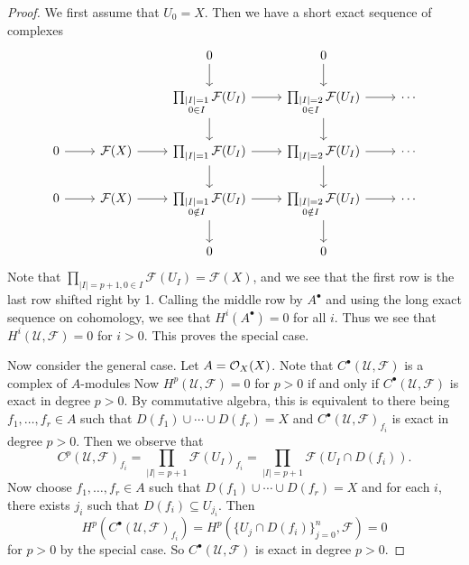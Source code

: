 \begin{proof}
  We first assume that $U_0 = X$.
  Then we have a short exact sequence
  of complexes
  \[
    \begin{tikzcd}
      & & 0 \ar[d] & 0 \ar[d] \\
      & & \prod_{\substack{|I| = 1 \\ 0 \in I}} \mathcal{F}(U_I) \ar[d] \ar[r] & \prod_{\substack{|I| = 2 \\ 0 \in I}} \mathcal{F}(U_I) \ar[d] \ar[r] & \cdots \\
      0 \ar[r] & \mathcal{F}(X) \ar[r] & \prod_{|I| = 1} \mathcal{F}(U_I) \ar[d] \ar[r] & \prod_{|I| = 2} \mathcal{F}(U_I) \ar[d] \ar[r] & \cdots \\
      0 \ar[r] & \mathcal{F}(X)
      \ar[r] & \prod_{\substack{|I| = 1 \\ 0 \notin I}} \mathcal{F}(U_I) \ar[d]
      \ar[r] & \prod_{\substack{|I| = 2 \\ 0 \notin I}} \mathcal{F}(U_I) \ar[d]
      \ar[r] & \cdots \\
             & & 0 & 0
    \end{tikzcd}
  \]
  Note that $\prod_{|I| = p + 1, 0 \in I} \mathcal{F}(U_I) = \mathcal{F}(X)$,
  and we see that
  the first row is the last row shifted
  right by 1. Calling the middle row
  by $A^\bullet$ and using the long
  exact sequence on cohomology, we see
  that $H^i(A^\bullet) = 0$ for all $i$.
  Thus we see that $H^i(\mathcal{U}, \mathcal{F}) = 0$ for $i > 0$. This proves the
  special case.

  Now consider the general case.
  Let $A = \mathcal{O}_X(X)$. Note that
  $C^\bullet(\mathcal{U}, \mathcal{F})$ is a
  complex of $A$-modules
  Now $H^p(\mathcal{U}, \mathcal{F}) = 0$
  for $p > 0$ if and only if
  $C^\bullet(\mathcal{U}, \mathcal{F})$
  is exact in degree $p > 0$. By
  commutative algebra, this is equivalent
  to there being
  $f_1, \dots, f_r \in A$ such that
  $D(f_1) \cup \cdots \cup D(f_r) = X$
  and $C^\bullet(\mathcal{U}, \mathcal{F})_{f_i}$
  is exact in degree $p > 0$. Then we
  observe that
  \[
    C^p(\mathcal{U}, \mathcal{F})_{f_i}
    = \prod_{|I| = p + 1}
    \mathcal{F}(U_I)_{f_i}
    = \prod_{|I| = p + 1} \mathcal{F}(U_I \cap D(f_i)).
  \]
  Now choose $f_1, \dots, f_r \in A$
  such that $D(f_1) \cup \cdots \cup D(f_r) = X$
  and for each $i$, there exists $j_i$
  such that $D(f_i) \subseteq U_{j_i}$.
  Then
  \[
    H^p(C^\bullet(\mathcal{U}, \mathcal{F})_{f_i})
    = H^p(\{U_j \cap D(f_i)\}_{j = 0}^n, \mathcal{F})
    = 0
  \]
  for $p > 0$ by the special case.
  So $C^\bullet(\mathcal{U}, \mathcal{F})$ is exact in degree $p > 0$.
\end{proof}


